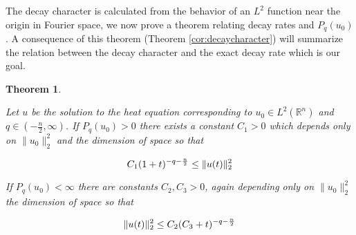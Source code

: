 \documentclass{amsart}
\newtheorem {Theorem}  {Theorem}
\numberwithin{Theorem}{section}
\numberwithin{equation}{section}
\theoremstyle{definition}
\theoremstyle{remark}
\begin{document}
The decay character is calculated from the behavior of an $L^2$ function near the origin in Fourier space, we now prove a theorem relating decay rates and $P_q(u_0)$.  A consequence of this theorem (Theorem \ref{cor:decaycharacter}) will summarize the relation between the decay character and the exact decay rate which is our goal.

\begin{Theorem}\label{theorem:decaybounds}

Let $u$ be the solution to the heat equation corresponding to $u_0\in L^2(\mathbb{R}^n)$ and $q\in (-\frac{n}{2},\infty)$.  If $P_q(u_0)>0$ there exists a constant $C_1>0$ which depends only on $\|u_0\|^2_2$ and the dimension of space so that

\begin{equation}
C_1(1+t)^{-q-\frac{n}{2}} \leq \|u(t)\|_2^2 \notag
\end{equation}

If $P_q(u_0)<\infty$ there are constants $C_2,C_3>0$, again depending only on $\|u_0\|_2^2$ the dimension of space so that

\begin{equation}
\|u(t)\|_2^2 \leq C_2(C_3+t)^{-q-\frac{n}{2}}\notag
\end{equation}

\end{Theorem}
\end{document}
